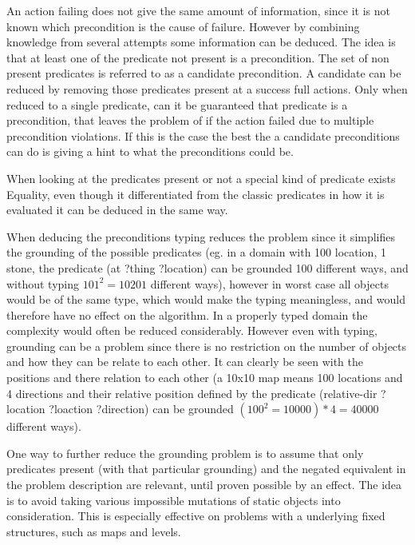 	An action failing does not give the same amount of information, since it is not known which precondition is the cause of failure. However by combining knowledge from several attempts some information can be deduced. The idea is that at least one of the predicate not present is a precondition. The set of non present predicates is referred to as a candidate precondition. A candidate can be reduced by removing those predicates present at a success full actions. Only when reduced to a single predicate, can it be guaranteed that predicate is a precondition, that leaves the problem of if the action failed due to multiple precondition violations. If this is the case the best the a candidate preconditions can do is giving a hint to what the preconditions could be.
	
	
	When looking at the predicates present or not a special kind of predicate exists Equality, even though it differentiated from the classic predicates in how it is evaluated it can be deduced in the same way.
	 

	
	
	
%		
%			
%	
%

	
	
			
	When deducing the preconditions typing reduces the problem since it simplifies the grounding of the possible predicates (eg. in a domain  with 100 location, 1 stone, the predicate (at ?thing ?location) can be grounded 100 different ways, and without typing $101 ^ 2 = 10201$ different ways), however in worst case all objects would be of the same type, which would make the typing meaningless, and would therefore have no effect on the algorithm. In a properly typed domain the complexity would often be reduced considerably. However even with typing, grounding can be a problem since there is no restriction on the number of objects and how they can be relate to each other. It can clearly be seen with the positions and there relation to each other (a 10x10 map means 100 locations and 4 directions and their relative position defined by the predicate (relative-dir ?location ?loaction ?direction) can be grounded $(100 ^ 2 = 10000)*4=40000$ different ways).
	
	One way to further reduce the grounding problem is to assume that only predicates present (with that particular grounding) and the negated equivalent in the problem description are relevant, until proven possible by an effect. The idea is to avoid taking various impossible mutations of static objects into consideration. This is especially effective on problems with a underlying fixed structures, such as maps and levels. %
	
